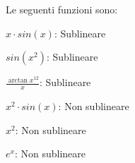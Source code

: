 \begin{example}
	Le seguenti funzioni sono:
	\begin{itemize}
		\begin{minipage}{0.5\linewidth}
			\item $x\cdot sin(x)$: Sublineare
			\item $sin(x^2)$: Sublineare
			\item $\frac{\arctan x^{12}}{x}$: Sublineare
		\end{minipage}
		\begin{minipage}{0.5\linewidth}
			\item $x^2\cdot sin(x)$: Non sublineare
			\item $x^2$: Non sublineare
			\item $e^x$: Non sublineare
		\end{minipage}
	\end{itemize}
\end{example}

